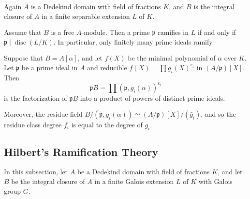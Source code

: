 \documentclass[12pt, oneside]{book}
\begin{document}
Again $A$ is a Dedekind domain with field of fractions $K$, and $B$ is the integral closure of $A$ in a finite separable extension $L$ of $K$.
\begin{theorem}
    Assume that $B$ is a free $A$-module.
    Then a prime $\mathfrak{p}$ ramifies in $L$ if and only if $\mathfrak{p} \mid \operatorname{disc}( L/ K)$. In particular, only finitely many prime ideals ramify.
\end{theorem}


\begin{theorem}
    Suppose that $B=A[\alpha]$, and let $f(X)$ be the minimal polynomial of $\alpha$ over $K$. Let $\mathfrak{p}$ be a prime ideal in $A$ and reducible $f(X) =\prod g_i(X)^{e_i}$ in $\left(A/\mathfrak{p}\right)[X]$. Then
    \begin{equation*}
        \mathfrak{p} B=\prod\left(\mathfrak{p}, g_i(\alpha)\right)^{e_i}
    \end{equation*}
    is the factorization of $\mathfrak{p} B$ into a product of powers of distinct prime ideals.

    Moreover, the residue field $B /\left(\mathfrak{p}, g_i(\alpha)\right) \simeq(A / \mathfrak{p})[X] /\left(\bar{g}_i\right)$, and so the residue class degree $f_i$ is equal to the degree of $g_i$.
\end{theorem}

\subsection{Hilbert's Ramification Theory}
In this subsection, let $A$ be a Dedekind domain with field of fractions $K$, and let $B$ be the integral closure of $A$ in a finite Galois extension $L$ of $K$ with Galois group $G$.
\end{document}

